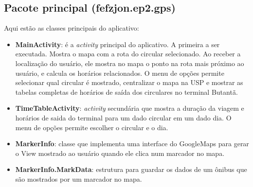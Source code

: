 \subsection{Pacote principal (fefzjon.ep2.gps)}
Aqui estão as classes principais do aplicativo:
\begin{itemize}
    \item \textbf{MainActivity}: é a \textit{activity} principal do aplicativo. A primeira a ser executada. Mostra o mapa com a rota do circular selecionado.
        Ao receber a localização do usuário, ele mostra no mapa o ponto na rota mais próximo ao usuário, e calcula os horários relacionados.
        O menu de opções permite selecionar qual circular é mostrado, centralizar o mapa na USP e mostrar as tabelas completas de horários de saída dos
        circulares no terminal Butantã.
    \item \textbf{TimeTableActivity}: \textit{activity} secundária que mostra a duração da viagem e horários de saida do terminal para um dado circular
        em um dado dia. O menu de opções permite escolher o circular e o dia.
    \item \textbf{MarkerInfo}: classe que implementa uma interface do GoogleMaps para gerar o View mostrado ao usuário quando ele clica num marcador no mapa.
    \item \textbf{MarkerInfo.MarkData}: estrutura para guardar os dados de um ônibus que são mostrados por um marcador no mapa.
\end{itemize}

